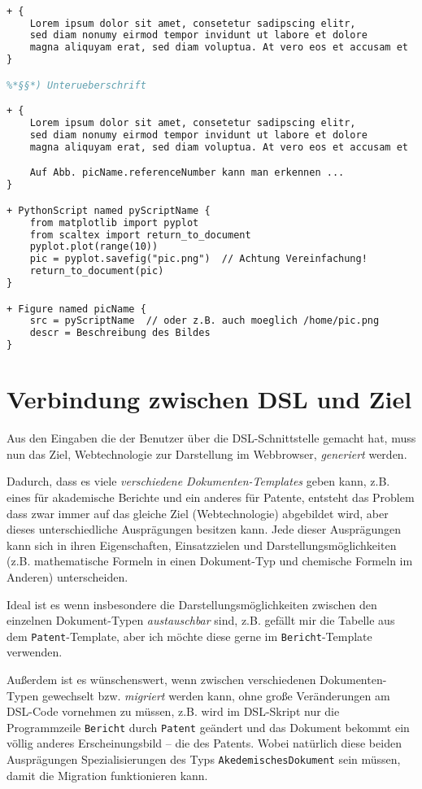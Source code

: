 \begin{lstlisting}[language=TeX]
%*§*) Ueberschrift

+ {
    Lorem ipsum dolor sit amet, consetetur sadipscing elitr,
    sed diam nonumy eirmod tempor invidunt ut labore et dolore
    magna aliquyam erat, sed diam voluptua. At vero eos et accusam et
}

%*§§*) Unterueberschrift

+ {
    Lorem ipsum dolor sit amet, consetetur sadipscing elitr,
    sed diam nonumy eirmod tempor invidunt ut labore et dolore
    magna aliquyam erat, sed diam voluptua. At vero eos et accusam et

    Auf Abb. picName.referenceNumber kann man erkennen ...
}

+ PythonScript named pyScriptName {
    from matplotlib import pyplot
    from scaltex import return_to_document
    pyplot.plot(range(10))
    pic = pyplot.savefig("pic.png")  // Achtung Vereinfachung!
    return_to_document(pic)
}

+ Figure named picName {
    src = pyScriptName  // oder z.B. auch moeglich /home/pic.png
    descr = Beschreibung des Bildes
}
\end{lstlisting}


\section{Verbindung zwischen DSL und Ziel}\label{sec-verbindung}

Aus den Eingaben die der Benutzer über die DSL-Schnittstelle gemacht hat,
muss nun das Ziel, Webtechnologie zur Darstellung im
Webbrowser, \emph{generiert} werden.

Dadurch, dass es viele \emph{verschiedene Dokumenten-Templates} geben kann,
z.B. eines für akademische Berichte und ein anderes für Patente, entsteht das
Problem dass zwar immer auf das gleiche Ziel (Webtechnologie) abgebildet
wird, aber dieses unterschiedliche Ausprägungen besitzen kann. Jede
dieser Ausprägungen kann sich in ihren Eigenschaften, Einsatzzielen
und Darstellungsmöglichkeiten (z.B. mathematische Formeln in einen
Dokument-Typ und chemische Formeln im Anderen) unterscheiden.

Ideal ist es wenn insbesondere die Darstellungsmöglichkeiten zwischen
den einzelnen Dokument-Typen \emph{austauschbar} sind, z.B. gefällt mir
die Tabelle aus dem \verb|Patent|-Template, aber ich möchte diese gerne im
\verb|Bericht|-Template verwenden.

Außerdem ist
es wünschenswert, wenn zwischen verschiedenen Dokumenten-Typen gewechselt
bzw. \emph{migriert} werden kann, ohne große Veränderungen am
DSL-Code vornehmen zu müssen, z.B. wird im
DSL-Skript nur die Programmzeile \verb|Bericht| durch \verb|Patent| geändert und
das Dokument bekommt ein völlig anderes Erscheinungsbild -- die des Patents.
Wobei natürlich diese beiden Ausprägungen Spezialisierungen des Typs
\verb|AkedemischesDokument| sein müssen, damit die Migration funktionieren kann.


